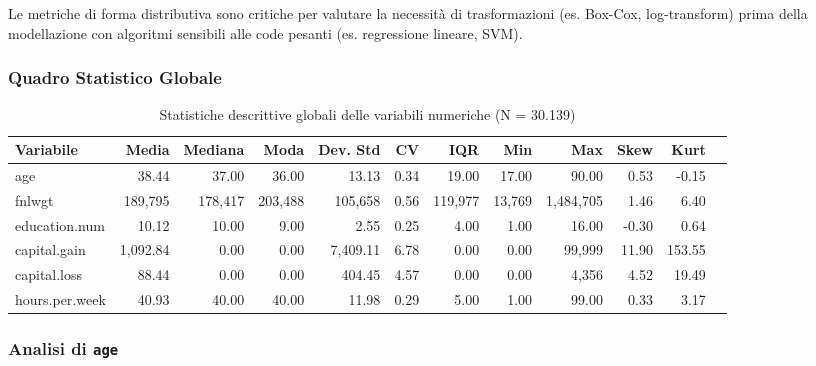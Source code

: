 \noindent
Le metriche di forma distributiva sono critiche per valutare la necessità di trasformazioni (es. Box-Cox, log-transform) prima della modellazione con algoritmi sensibili alle code pesanti (es. regressione lineare, SVM).
\subsubsection{Quadro Statistico Globale}

\begin{table}[H]
    \centering
    \caption{Statistiche descrittive globali delle variabili numeriche (N = 30.139)}
    \begin{adjustbox}{width=\textwidth,center}
    \begin{tabular}{lrrrrrrrrrrr}
        \toprule
        \textbf{Variabile} & \textbf{Media} & \textbf{Mediana} & \textbf{Moda} & \textbf{Dev. Std} & \textbf{CV} & \textbf{IQR} & \textbf{Min} & \textbf{Max} & \textbf{Skew} & \textbf{Kurt} \\
        \midrule
        age & 38.44 & 37.00 & 36.00 & 13.13 & 0.34 & 19.00 & 17.00 & 90.00 & 0.53 & -0.15 \\
        fnlwgt & 189,795 & 178,417 & 203,488 & 105,658 & 0.56 & 119,977 & 13,769 & 1,484,705 & 1.46 & 6.40 \\
        education.num & 10.12 & 10.00 & 9.00 & 2.55 & 0.25 & 4.00 & 1.00 & 16.00 & -0.30 & 0.64 \\
        capital.gain & 1,092.84 & 0.00 & 0.00 & 7,409.11 & 6.78 & 0.00 & 0.00 & 99,999 & 11.90 & 153.55 \\
        capital.loss & 88.44 & 0.00 & 0.00 & 404.45 & 4.57 & 0.00 & 0.00 & 4,356 & 4.52 & 19.49 \\
        hours.per.week & 40.93 & 40.00 & 40.00 & 11.98 & 0.29 & 5.00 & 1.00 & 99.00 & 0.33 & 3.17 \\
        \bottomrule
    \end{tabular}
    \end{adjustbox}
\end{table}

\vspace{1cm}

\newpage
\subsubsection{Analisi di \texttt{age}}

